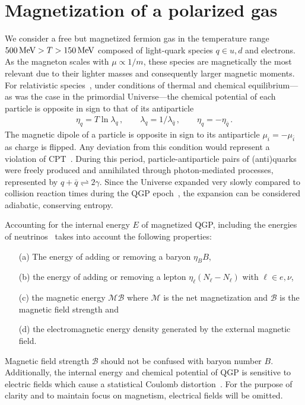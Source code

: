 \documentclass[epjST]{svjour}
\newcommand*{\MeV}{\text{\,MeV}}
\numberwithin{equation}{section}
\begin{document}
\section{Magnetization of a polarized gas}
\label{sec:magnetization}
We consider a free but magnetized fermion gas in the temperature range \(500\MeV>T>150\MeV\) composed of light-quark species \(q \in {u,d}\) and electrons. As the magneton scales with \(\mu \propto 1/m\), these species are magnetically the most relevant due to their lighter masses and consequently larger magnetic moments. For relativistic species~\cite{Elze:1980er}, under conditions of thermal and chemical equilibrium---as was the case in the primordial Universe---the chemical potential of each particle is opposite in sign to that of its antiparticle
\begin{align}
    \eta_{q}=T\ln\lambda_{q}\,,\qquad
    \lambda_{q}=1/\lambda_{\bar{q}}\,,\qquad
    \eta_{q}=-\eta_{\bar{q}}\,.
\end{align}
The magnetic dipole of a particle is opposite in sign to its antiparticle $\mu_{i}=-\mu_{\bar{i}}$ as charge is flipped. Any deviation from this condition would represent a violation of CPT~\cite{Colladay:1996iz,Bluhm:1997ci,BASE:2016yuo}. During this period, particle-antiparticle pairs of (anti)quarks were freely produced and annihilated through photon-mediated processes, represented by $q+\bar{q}\rightleftharpoons2\gamma$. Since the Universe expanded very slowly compared to collision reaction times during the QGP epoch~\cite{Rafelski:2023emw,Yang:2024ret}, the expansion can be considered adiabatic, conserving entropy.

Accounting for the internal energy $E$ of magnetized QGP, including the energies of neutrinos~\cite{Birrell:2014ona} takes into account the following properties: 
\begin{itemize}
    \item[(a)] The energy of adding or removing a baryon $\eta_{B}B$,
    \item[(b)] the energy of adding or removing a lepton $\eta_{\ell}(N_{\ell}-N_{\ell})$ with $\ell\in {e,\nu}$, 
    \item[(c)] the magnetic energy $\mathcal{M}\mathcal{B}$ where $\mathcal{M}$ is the net magnetization and $\mathcal{B}$ is the magnetic field strength and
    \item[(d)] the electromagnetic energy density generated by the external magnetic field.
\end{itemize}
Magnetic field strength $\mathcal{B}$ should not be confused with baryon number $B$. Additionally, the internal energy and chemical potential of QGP is sensitive to electric fields which cause a statistical Coulomb distortion~\cite{Sigl:1996dm,Letessier:2002ony}. For the purpose of clarity and to maintain focus on magnetism, electrical fields will be omitted.
\end{document}
